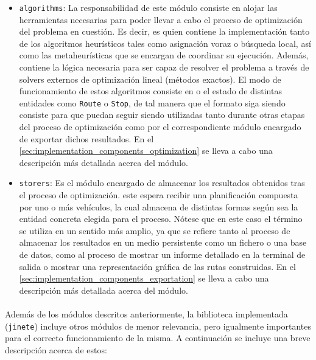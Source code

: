 \documentclass{subfiles}
\begin{document}
\begin{itemize}
              \item \texttt{algorithms}: La responsabilidad de este módulo consiste en alojar las herramientas necesarias para poder llevar a cabo el proceso de optimización del problema en cuestión. Es decir, es quien contiene la implementación tanto de los algoritmos heurísticos tales como asignación voraz o búsqueda local, así como las metaheurísticas que se encargan de coordinar su ejecución. Además, contiene la lógica necesaria para ser capaz de resolver el problema a través de solvers externos de optimización lineal (métodos exactos). El modo de funcionamiento de estos algoritmos consiste en  o  el estado de distintas entidades como \texttt{Route} o \texttt{Stop}, de tal manera que el formato siga siendo consiste para que puedan seguir siendo utilizadas tanto durante otras etapas del proceso de optimización como por el correspondiente módulo encargado de exportar dichos resultados. En el \cref{sec:implementation_components_optimization} se lleva a cabo una descripción más detallada acerca del módulo.
            
              \item \texttt{storers}: Es el módulo encargado de almacenar los resultados obtenidos tras el proceso de optimización. este espera recibir una planificación compuesta por uno o más vehículos, la cual almacena de distintas formas según sea la entidad concreta elegida para el proceso. Nótese que en este caso el término  se utiliza en un sentido más amplio, ya que se refiere tanto al proceso de almacenar los resultados en un medio persistente como un fichero o una base de datos, como al proceso de mostrar un informe detallado en la terminal de salida o mostrar una representación gráfica de las rutas construidas. En el \cref{sec:implementation_components_exportation} se lleva a cabo una descripción más detallada acerca del módulo.
 
         
          \end{itemize}

          \paragraph{}
          Además de los módulos descritos anteriormente, la biblioteca implementada (\texttt{jinete}) incluye otros módulos de menor relevancia, pero igualmente importantes para el correcto funcionamiento de la misma. A continuación se incluye una breve descripción acerca de estos:
\end{document}
